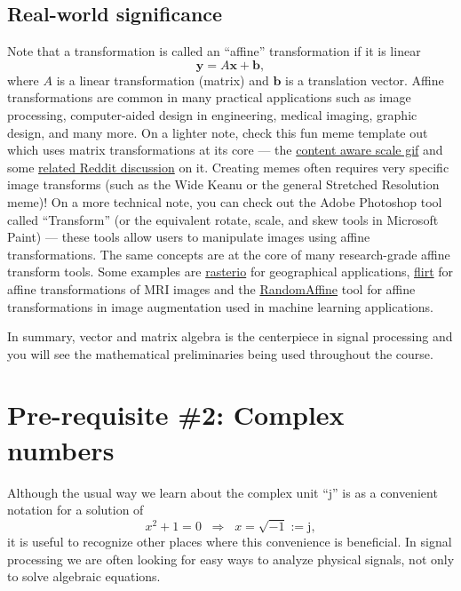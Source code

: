 \documentclass{ee102_notes}
\begin{document}
\subsection{Real-world significance}
Note that a transformation is called an ``affine'' transformation if it is linear
\[
\mathbf{y} = A\mathbf{x} + \mathbf{b},
\]
where $A$ is a linear transformation (matrix) and $\mathbf{b}$ is a translation vector. Affine transformations are common in many practical applications such as image processing, computer-aided design in engineering, medical imaging, graphic design, and many more. On a lighter note, check this fun meme template out which uses matrix transformations at its core --- the \href{https://www.youtube.com/watch?v=hYdmPw-SrMQ}{content aware scale gif} and some \href{https://www.reddit.com/r/davinciresolve/comments/1780z24/how\_to\_do\_content\_aware\_scale\_meme\_effect\_for/}{related Reddit discussion} on it. Creating memes often requires very specific image transforms (such as the Wide Keanu or the general Stretched Resolution meme)! On a more technical note, you can check out the Adobe Photoshop tool called ``Transform'' (or the equivalent rotate, scale, and skew tools in Microsoft Paint) --- these tools allow users to manipulate images using affine transformations. The same concepts are at the core of many research-grade affine transform tools. Some examples are \href{https://affine.readthedocs.io/en/latest/index.html#}{rasterio} for geographical applications, \href{https://open.win.ox.ac.uk/pages/fsl/fslpy/_modules/fsl/transform/flirt.html}{flirt} for affine transformations of MRI images and the \href{https://pytorch.org/vision/stable/transforms.html#torchvision.transforms.RandomAffine}{RandomAffine} tool for affine transformations in image augmentation used in machine learning applications.

In summary, vector and matrix algebra is the centerpiece in signal processing and you will see the mathematical preliminaries being used throughout the course.
\section{Pre-requisite \#2: Complex numbers}

Although the usual way we learn about the complex unit ``$\mathrm{j}$'' is as
a convenient notation for a solution of
\[
x^{2}+1=0 \;\;\Rightarrow\;\; x=\sqrt{-1}:=\mathrm{j},
\]
it is useful to recognize other places where this convenience is beneficial.
In signal processing we are often looking for easy ways to analyze physical
signals, not only to solve algebraic equations.
\end{document}
